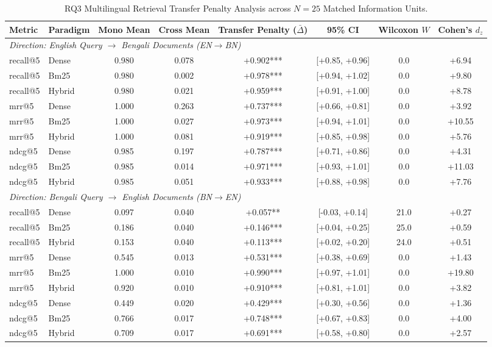 \begin{table}[t]
\centering
\small
\begin{tabular}{llcccccc}
\toprule
\textbf{Metric} & \textbf{Paradigm} & \textbf{Mono Mean} & \textbf{Cross Mean} & \textbf{Transfer Penalty ($\bar{\Delta}$)} & \textbf{95\% CI} & \textbf{Wilcoxon $W$} & \textbf{Cohen's $d_z$} \\
\midrule
\multicolumn{8}{l}{\textit{Direction: English Query $\to$ Bengali Documents (EN$\to$BN)}} \\
recall@5 & Dense & 0.980 & 0.078 & +0.902*** & [+0.85, +0.96] & 0.0 & +6.94 \\
recall@5 & Bm25 & 0.980 & 0.002 & +0.978*** & [+0.94, +1.02] & 0.0 & +9.80 \\
recall@5 & Hybrid & 0.980 & 0.021 & +0.959*** & [+0.91, +1.00] & 0.0 & +8.78 \\
mrr@5 & Dense & 1.000 & 0.263 & +0.737*** & [+0.66, +0.81] & 0.0 & +3.92 \\
mrr@5 & Bm25 & 1.000 & 0.027 & +0.973*** & [+0.94, +1.01] & 0.0 & +10.55 \\
mrr@5 & Hybrid & 1.000 & 0.081 & +0.919*** & [+0.85, +0.98] & 0.0 & +5.76 \\
ndcg@5 & Dense & 0.985 & 0.197 & +0.787*** & [+0.71, +0.86] & 0.0 & +4.31 \\
ndcg@5 & Bm25 & 0.985 & 0.014 & +0.971*** & [+0.93, +1.01] & 0.0 & +11.03 \\
ndcg@5 & Hybrid & 0.985 & 0.051 & +0.933*** & [+0.88, +0.98] & 0.0 & +7.76 \\
\midrule
\multicolumn{8}{l}{\textit{Direction: Bengali Query $\to$ English Documents (BN$\to$EN)}} \\
recall@5 & Dense & 0.097 & 0.040 & +0.057** & [-0.03, +0.14] & 21.0 & +0.27 \\
recall@5 & Bm25 & 0.186 & 0.040 & +0.146*** & [+0.04, +0.25] & 25.0 & +0.59 \\
recall@5 & Hybrid & 0.153 & 0.040 & +0.113*** & [+0.02, +0.20] & 24.0 & +0.51 \\
mrr@5 & Dense & 0.545 & 0.013 & +0.531*** & [+0.38, +0.69] & 0.0 & +1.43 \\
mrr@5 & Bm25 & 1.000 & 0.010 & +0.990*** & [+0.97, +1.01] & 0.0 & +19.80 \\
mrr@5 & Hybrid & 0.920 & 0.010 & +0.910*** & [+0.81, +1.01] & 0.0 & +3.82 \\
ndcg@5 & Dense & 0.449 & 0.020 & +0.429*** & [+0.30, +0.56] & 0.0 & +1.36 \\
ndcg@5 & Bm25 & 0.766 & 0.017 & +0.748*** & [+0.67, +0.83] & 0.0 & +4.00 \\
ndcg@5 & Hybrid & 0.709 & 0.017 & +0.691*** & [+0.58, +0.80] & 0.0 & +2.57 \\
\bottomrule
\end{tabular}
\caption{RQ3 Multilingual Retrieval Transfer Penalty Analysis across $N=25$ Matched Information Units.}
\label{tab:rq3_transfer_penalty}
\end{table}
